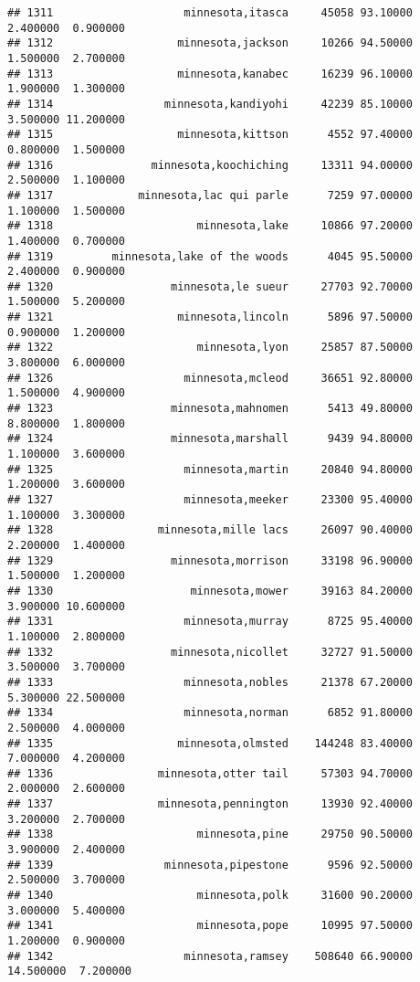 \documentclass[
]{article}
\begin{document}
\begin{verbatim}
## 1311                    minnesota,itasca     45058 93.10000  2.400000  0.900000
## 1312                   minnesota,jackson     10266 94.50000  1.500000  2.700000
## 1313                   minnesota,kanabec     16239 96.10000  1.900000  1.300000
## 1314                 minnesota,kandiyohi     42239 85.10000  3.500000 11.200000
## 1315                   minnesota,kittson      4552 97.40000  0.800000  1.500000
## 1316               minnesota,koochiching     13311 94.00000  2.500000  1.100000
## 1317             minnesota,lac qui parle      7259 97.00000  1.100000  1.500000
## 1318                      minnesota,lake     10866 97.20000  1.400000  0.700000
## 1319         minnesota,lake of the woods      4045 95.50000  2.400000  0.900000
## 1320                  minnesota,le sueur     27703 92.70000  1.500000  5.200000
## 1321                   minnesota,lincoln      5896 97.50000  0.900000  1.200000
## 1322                      minnesota,lyon     25857 87.50000  3.800000  6.000000
## 1326                    minnesota,mcleod     36651 92.80000  1.500000  4.900000
## 1323                  minnesota,mahnomen      5413 49.80000  8.800000  1.800000
## 1324                  minnesota,marshall      9439 94.80000  1.100000  3.600000
## 1325                    minnesota,martin     20840 94.80000  1.200000  3.600000
## 1327                    minnesota,meeker     23300 95.40000  1.100000  3.300000
## 1328                minnesota,mille lacs     26097 90.40000  2.200000  1.400000
## 1329                  minnesota,morrison     33198 96.90000  1.500000  1.200000
## 1330                     minnesota,mower     39163 84.20000  3.900000 10.600000
## 1331                    minnesota,murray      8725 95.40000  1.100000  2.800000
## 1332                  minnesota,nicollet     32727 91.50000  3.500000  3.700000
## 1333                    minnesota,nobles     21378 67.20000  5.300000 22.500000
## 1334                    minnesota,norman      6852 91.80000  2.500000  4.000000
## 1335                   minnesota,olmsted    144248 83.40000  7.000000  4.200000
## 1336                minnesota,otter tail     57303 94.70000  2.000000  2.600000
## 1337                minnesota,pennington     13930 92.40000  3.200000  2.700000
## 1338                      minnesota,pine     29750 90.50000  3.900000  2.400000
## 1339                 minnesota,pipestone      9596 92.50000  2.500000  3.700000
## 1340                      minnesota,polk     31600 90.20000  3.000000  5.400000
## 1341                      minnesota,pope     10995 97.50000  1.200000  0.900000
## 1342                    minnesota,ramsey    508640 66.90000 14.500000  7.200000

\end{verbatim}
\end{document}

